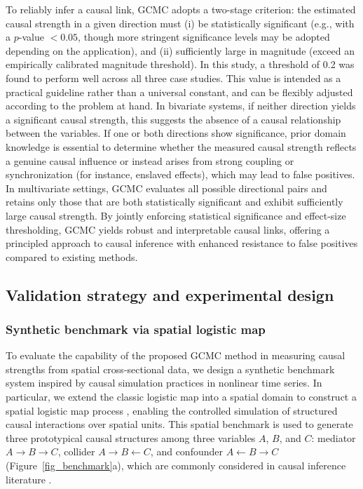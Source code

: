 \documentclass[authoryear,preprint,review,12pt]{elsarticle}
\begin{document}
To reliably infer a causal link, GCMC adopts a two-stage criterion: the estimated causal strength in a given direction must (i) be statistically significant (e.g., with a $p$-value $< 0.05$, though more stringent significance levels may be adopted depending on the application), and (ii) sufficiently large in magnitude (exceed an empirically calibrated magnitude threshold). In this study, a threshold of 0.2 was found to perform well across all three case studies. This value is intended as a practical guideline rather than a universal constant, and can be flexibly adjusted according to the problem at hand. In bivariate systems, if neither direction yields a significant causal strength, this suggests the absence of a causal relationship between the variables. If one or both directions show significance, prior domain knowledge is essential to determine whether the measured causal strength reflects a genuine causal influence or instead arises from strong coupling or synchronization (for instance, enslaved effects), which may lead to false positives. In multivariate settings, GCMC evaluates all possible directional pairs and retains only those that are both statistically significant and exhibit sufficiently large causal strength. By jointly enforcing statistical significance and effect-size thresholding, GCMC yields robust and interpretable causal links, offering a principled approach to causal inference with enhanced resistance to false positives compared to existing methods.

\subsection{Validation strategy and experimental design}

\subsubsection{Synthetic benchmark via spatial logistic map}

To evaluate the capability of the proposed GCMC method in measuring causal strengths from spatial cross-sectional data, we design a synthetic benchmark system inspired by causal simulation practices in nonlinear time series. In particular, we extend the classic logistic map into a spatial domain to construct a spatial logistic map process \citep{willeboordse2003slm}, enabling the controlled simulation of structured causal interactions over spatial units. This spatial benchmark is used to generate three prototypical causal structures among three variables \(A\), \(B\), and \(C\): mediator $A \rightarrow B \rightarrow C$, collider $A \rightarrow B \leftarrow C$, and confounder $A \leftarrow B \rightarrow C$ (Figure~\ref{fig_benchmark}a), which are commonly considered in causal inference literature \citep{sanchez2024surd}.
\end{document}
